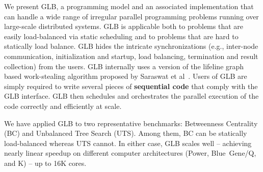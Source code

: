 We present GLB, a programming model and an associated
implementation that can handle a wide range of irregular parallel programming
problems running over large-scale distributed systems.
GLB is applicable both to problems that are easily
load-balanced via static scheduling and to problems that are hard to
statically load balance. GLB hides the intricate synchronizations
(e.g., inter-node communication, initialization and startup, load balancing,
termination and result collection) from the users. GLB internally uses a version
of the lifeline graph based work-stealing algorithm proposed by
Saraswat et al~\cite{glb}. Users of GLB are
simply required to write several pieces of \textbf{sequential code} that
comply with the GLB interface. GLB then schedules and orchestrates
the parallel execution of the code correctly and efficiently at scale.

We have applied GLB to two representative benchmarks: Betweenness
Centrality (BC)  and Unbalanced Tree Search (UTS). Among them, BC can
be statically load-balanced whereas UTS cannot. In either case, GLB
scales well -- achieving nearly linear speedup on different computer
architectures (Power, Blue~Gene/Q, and K) -- up to 16K cores.

